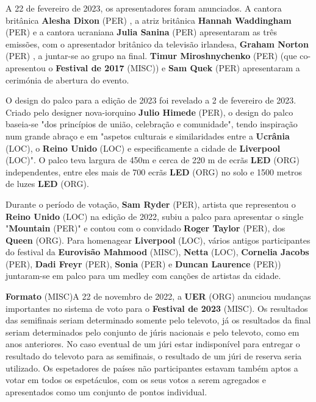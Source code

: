 \documentclass[12pt,a4paper]{article}
\begin{document}
A 22 de fevereiro de 2023, os apresentadores foram anunciados. A cantora britânica \textbf{Alesha Dixon} (PER) , a atriz britânica \textbf{Hannah Waddingham} (PER) e a cantora ucraniana \textbf{Julia Sanina} (PER) apresentaram as três emissões, com o apresentador britânico da televisão irlandesa, \textbf{Graham Norton} (PER) , a juntar-se ao grupo na final. \textbf{Timur Miroshnychenko} (PER) (que co-apresentou o \textbf{Festival de 2017} (MISC)) e \textbf{Sam Quek} (PER) apresentaram a cerimónia de abertura do evento.

O design do palco para a edição de 2023 foi revelado a 2 de fevereiro de 2023. Criado pelo designer nova-iorquino \textbf{Julio Himede} (PER), o design do palco baseia-se "dos princípios de união, celebração e comunidade", tendo inspiração num grande abraço e em "aspetos culturais e similaridades entre a \textbf{Ucrânia} (LOC), o \textbf{Reino Unido} (LOC) e especificamente a cidade de \textbf{Liverpool} (LOC)". O palco teva largura de 450m e cerca de 220 m de ecrãs \textbf{LED} (ORG) independentes, entre eles mais de 700 ecrãs \textbf{LED} (ORG) no solo e 1500 metros de luzes \textbf{LED} (ORG).

Durante o período de votação, \textbf{Sam Ryder} (PER), artista que representou o \textbf{Reino Unido} (LOC) na edição de 2022, subiu a palco para apresentar o single "\textbf{Mountain} (PER)" e contou com o convidado \textbf{Roger Taylor} (PER), dos \textbf{Queen} (ORG). Para homenagear \textbf{Liverpool} (LOC), vários antigos participantes do festival da \textbf{Eurovisão Mahmood} (MISC), \textbf{Netta} (LOC), \textbf{Cornelia Jacobs} (PER), \textbf{Dadi Freyr} (PER), \textbf{Sonia} (PER) e \textbf{Duncan Laurence} (PER)) juntaram-se em palco para um medley com canções de artistas da cidade.



\textbf{Formato} (MISC)A 22 de novembro de 2022, a \textbf{UER} (ORG) anunciou mudanças importantes no sistema de voto para o \textbf{Festival de 2023} (MISC). Os resultados das semifinais seriam determinado somente pelo televoto, já os resultados da final seriam determinados pelo conjunto de júris nacionais e pelo televoto, como em anos anteriores. No caso eventual de um júri estar indisponível para entregar o resultado do televoto para as semifinais, o resultado de um júri de reserva seria utilizado. Os espetadores de países não participantes estavam também aptos a votar em todos os espetáculos, com os seus votos a serem agregados e apresentados como um conjunto de pontos individual.
\end{document}
